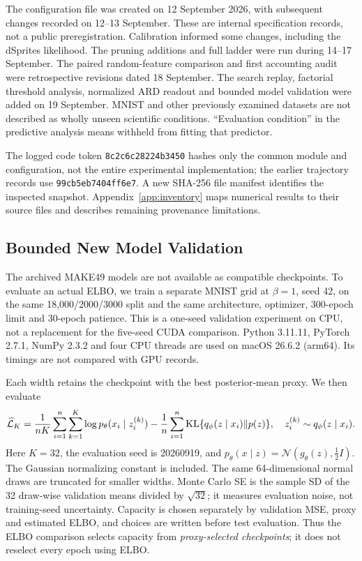 The configuration file was created on 12 September 2026, with subsequent
changes recorded on 12--13 September. These are internal specification
records, not a public preregistration. Calibration informed some changes,
including the dSprites likelihood. The pruning additions and full ladder
were run during 14--17 September. The paired random-feature comparison
and first accounting audit were retrospective revisions dated 18 September.
The search replay, factorial threshold analysis, normalized ARD readout
and bounded model validation were added on 19 September.
MNIST and other previously examined datasets are not described as wholly
unseen scientific conditions. ``Evaluation condition'' in the predictive
analysis means withheld from fitting that predictor.

The logged code token \texttt{8c2c6c28224b3450} hashes only the common
module and configuration, not the entire experimental implementation;
the earlier trajectory records use \texttt{99cb5eb7404ff6e7}.
A new SHA-256 file manifest identifies the inspected snapshot.
Appendix~\ref{app:inventory} maps numerical results to their source files
and describes remaining provenance limitations.

\subsection{Bounded New Model Validation}\label{sec:newvalidation}
The archived MAKE49 models are not available as compatible checkpoints.
To evaluate an actual ELBO, we train a separate MNIST grid at $\beta=1$,
seed 42, on the same 18,000/2000/3000 split and the same architecture,
optimizer, 300-epoch limit and 30-epoch patience. This is a one-seed
validation experiment on CPU, not a replacement for the five-seed CUDA
comparison. Python 3.11.11, PyTorch 2.7.1, NumPy 2.3.2 and four CPU threads
are used on macOS 26.6.2 (arm64). Its timings are not compared with GPU
records.

Each width retains the checkpoint with the best posterior-mean proxy.
We then evaluate
\begin{equation}
 \widehat{\mathcal L}_K
 =\frac{1}{nK}\sum_{i=1}^n\sum_{k=1}^K
 \log p_\theta(x_i\mid z_i^{(k)})
 -\frac1n\sum_{i=1}^n
 {\rm KL}\{q_\phi(z\mid x_i)\Vert p(z)\},\quad
 z_i^{(k)}\sim q_\phi(z\mid x_i).
 \label{eq:mc}
\end{equation}
Here $K=32$, the evaluation seed is 20260919, and
$p_\theta(x\mid z)=\mathcal N(g_\theta(z),\tfrac12 I)$.
The Gaussian normalizing constant is included. The same 64-dimensional
normal draws are truncated for smaller widths. Monte Carlo SE is the
sample SD of the 32 draw-wise validation means divided by $\sqrt{32}$;
it measures evaluation noise, not training-seed uncertainty.
Capacity is chosen separately by validation MSE, proxy and estimated
ELBO, and choices are written before test evaluation. Thus the ELBO
comparison selects capacity from \emph{proxy-selected checkpoints};
it does not reselect every epoch using ELBO.

